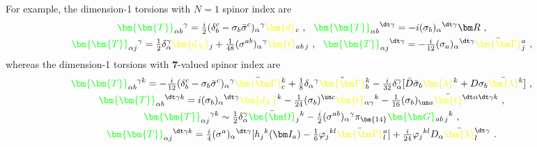 \documentclass[letter,12pt]{article} %
\def\physical#1{ {\color{green} {\bm {#1}} } }
\def\auxiliary#1{ {\color{yellow} {\bm {#1}} } }
\def\FS#1{ { {\physical{\bm {#1}} } } }
\def\d{ \auxiliary{d_X} }
\def\dX{ \auxiliary{d} }
\def\l{ \auxiliary{\lambda} }
\def\t{ \auxiliary{t} }
\def\Ga{\auxiliary{\bm \Gamma}}
\def\Oh{\physical{ {\bm \Omega} }}
\def\I{\bm I}
\def\F{\bm F}
\def\G{ \physical{ {\bm G} } }
\def\Torsion{ \physical{ {\bm T} } }
\def\Torsion{ {\FS{T}} }
\begin{document}
For example, the dimension-1 torsions with $N=1$ spinor index are
\begin{gather}
\Torsion_{\alpha b}{}^{\gamma} = 
	\tfrac i2 (\delta_b^c - \sigma_b \bar \sigma^c)_{\alpha}{}^\gamma  \dX_c
~,~~
\Torsion_{\alpha b}{}^{\dt \gamma} = 
	- i (\sigma_b)_{\alpha}{}^{\dt \gamma} {\bm R}
~,~~
	\cr	
\Torsion_{\alpha j}{}^{\gamma} = 
	\tfrac12 \delta_\alpha^\gamma \d_j 
	+\tfrac1{48} (\sigma^{ab})_\alpha{}^\gamma \t_{ab \,j }
~,~~
\Torsion_{\alpha j}{}^{\dt \gamma} = -\tfrac i{12} (\sigma_a)_\alpha{}^{\dt \gamma} \bar \Ga_j^a
~,~~
\end{gather}
whereas the dimension-1 torsions with $\bm 7$-valued spinor index are
\begin{gather}
\Torsion_{\alpha b}{}^{\gamma k} =
-\tfrac i{12} (\delta_b^c - \sigma_b\bar \sigma^c)_\alpha{}^\gamma \bar \Ga_c^k 
	+ \tfrac 18 \delta_\alpha{}^\gamma \check \Ga_b^k 
	-\tfrac i{32} \delta_\alpha^\gamma 
		[ \bar D \bar \sigma_b \l^k + D\sigma_b \bar \l{}^k]
~,~~
\cr
\Torsion_{\alpha b}{}^{\dt \gamma k} =
	i(\sigma_b)_\alpha{}^{\dt \gamma} \d^k 
	-\tfrac1{24} (\sigma_b)^{\un c} \t_{\alpha \gamma}{}^k
	-\tfrac1{16} (\sigma_b)_{\un a} \bar \t^{\dt \alpha \dt \gamma k}
~,~~
	\cr	
\Torsion_{\alpha j}{}^{\gamma k} \sim \tfrac12 \delta_\alpha^\gamma \bar \Oh_j{}^k
	-\tfrac i2 (\sigma^{ab})_\alpha{}^\gamma \pi_{\bm {14}}\G_{ab\, j}{}^k 
~,~~
\cr
\Torsion_{\alpha j}{}^{\dt \gamma k} = 
	\tfrac i4 (\sigma^a)_\alpha{}^{\dt \gamma} [
		h_j{}^k(\I_{a}) 
	-\tfrac 1{6} \varphi_j{}^{kl} \bar \Ga_l^a
	]
	+\tfrac i{24} \varphi_j{}^{kl} D_\alpha \bar \l^{\dt \gamma}_l
~.~~	
\end{gather}
\end{document}
